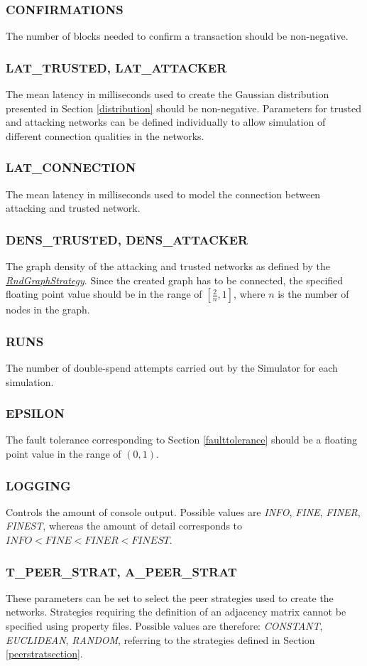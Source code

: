 \documentclass[a4paper,12pt,twoside]{report}
\begin{document}
\subsubsection{CONFIRMATIONS}
The number of blocks needed to confirm a transaction should be non-negative.
\subsubsection{LAT\_TRUSTED, LAT\_ATTACKER}
The mean latency in milliseconds used to create the Gaussian distribution presented in Section \ref{distribution} should be non-negative. Parameters for trusted and attacking networks can be defined individually to allow simulation of different connection qualities in the networks.
\subsubsection{LAT\_CONNECTION}
The mean latency in milliseconds used to model the connection between attacking and trusted network.
\subsubsection{DENS\_TRUSTED, DENS\_ATTACKER}
The graph density of the attacking and trusted networks as defined by the \hyperref[rndgraphstrategy]{\textit{RndGraphStrategy}}. Since the created graph has to be connected, the specified floating point value should be in the range of $[\frac{2}{n}, 1]$, where $n$ is the number of nodes in the graph.
\subsubsection{RUNS}
The number of double-spend attempts carried out by the Simulator for each simulation.
\subsubsection{EPSILON}
The fault tolerance corresponding to Section \ref{faulttolerance} should be a floating point value in the range of $(0, 1)$.
\subsubsection{LOGGING}
Controls the amount of console output. Possible values are \textit{INFO}, \textit{FINE}, \textit{FINER}, \textit{FINEST}, whereas the amount of detail corresponds to $\textit{INFO} < \textit{FINE} < \textit{FINER} < \textit{FINEST}$.
\subsubsection{T\_PEER\_STRAT, A\_PEER\_STRAT}
These parameters can be set to select the peer strategies used to create the networks. Strategies requiring the definition of an adjacency matrix cannot be specified using property files. Possible values are therefore: \textit{CONSTANT}, \textit{EUCLIDEAN}, \textit{RANDOM}, referring to the strategies defined in Section \ref{peerstratsection}.
\end{document}

